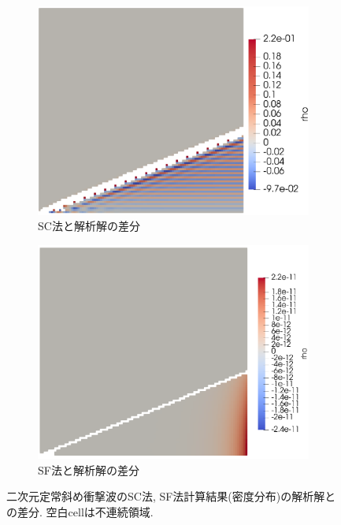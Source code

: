 \documentclass[a4j]{jarticle}
\begin{document}
\begin{figure}[h]
  \centering
  \begin{subfigure}[t]{0.45\textwidth}
    \centering
    \includegraphics[width=\linewidth]{2Ddiagcompa.pdf}
    \caption{SC法と解析解の差分}
  \end{subfigure}
  \hfill
  \begin{subfigure}[b]{0.45\textwidth}
    \centering
    \includegraphics[width=\linewidth]{2Ddiagcompb.pdf}
    \caption{SF法と解析解の差分}
  \end{subfigure}
  \caption{二次元定常斜め衝撃波のSC法, SF法計算結果(密度分布)の解析解との差分. 空白cellは不連続領域.}
  \label{fig:2Ddiagcomp}
\end{figure}
\end{document}
